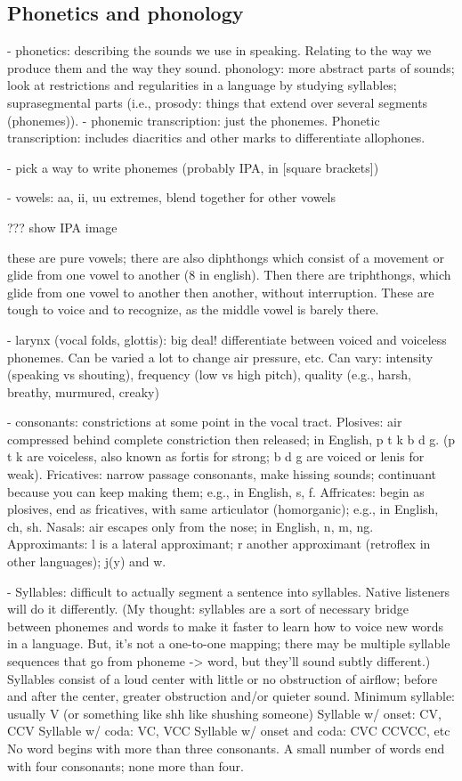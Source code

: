 \subsection{Phonetics and phonology}

- phonetics: describing the sounds we use in speaking.
  Relating to the way we produce them and the way they sound.
  phonology: more abstract parts of sounds; look at restrictions
  and regularities in a language by studying syllables;
  suprasegmental parts (i.e., prosody:
  things that extend over several segments (phonemes)).
  - phonemic transcription: just the phonemes. Phonetic transcription:
    includes diacritics and other marks to differentiate allophones.

  - pick a way to write phonemes (probably IPA, in [square brackets])

- vowels: aa, ii, uu extremes, blend together for other vowels

  ??? show IPA image

  these are pure vowels; there are also diphthongs which consist
  of a movement or glide from one vowel to another (8 in english).
  Then there are triphthongs, which glide from one vowel
  to another then another, without interruption.
  These are tough to voice and to recognize, as the middle
  vowel is barely there.

- larynx (vocal folds, glottis): big deal! differentiate between
  voiced and voiceless phonemes. Can be varied a lot
  to change air pressure, etc. Can vary:
  intensity (speaking vs shouting),
  frequency (low vs high pitch),
  quality (e.g., harsh, breathy, murmured, creaky)

- consonants: constrictions at some point in the vocal tract.
  Plosives: air compressed behind complete constriction then released;
  in English, p t k b d g. (p t k are voiceless, also known as fortis
  for strong; b d g are voiced or lenis for weak).
  Fricatives: narrow passage consonants, make hissing sounds;
  continuant because you can keep making them; e.g., in English, s, f.
  Affricates: begin as plosives, end as fricatives, with same articulator
  (homorganic); e.g., in English, ch, sh.
  Nasals: air escapes only from the nose; in English, n, m, ng.
  Approximants: l is a lateral approximant; r another approximant
  (retroflex in other languages); j(y) and w.

- Syllables: difficult to actually segment a sentence into syllables.
  Native listeners will do it differently. (My thought: syllables
  are a sort of necessary bridge between phonemes and words to make
  it faster to learn how to voice new words in a language. But,
  it's not a one-to-one mapping; there may be multiple syllable
  sequences that go from phoneme -> word, but they'll sound subtly different.)
  Syllables consist of a loud center with little or no obstruction
  of airflow; before and after the center, greater obstruction and/or
  quieter sound.
  Minimum syllable: usually V (or something like shh like shushing someone)
  Syllable w/ onset: CV, CCV
  Syllable w/ coda: VC, VCC
  Syllable w/ onset and coda: CVC CCVCC, etc
  No word begins with more than three consonants.
  A small number of words end with four consonants; none more than four.

